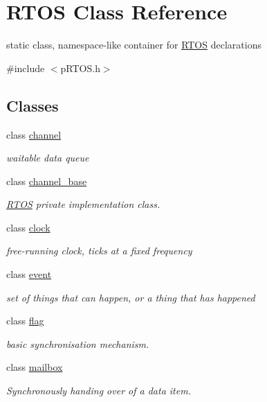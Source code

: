 \hypertarget{class_r_t_o_s}{}\section{R\+T\+OS Class Reference}
\label{class_r_t_o_s}


static class, namespace-\/like container for \hyperlink{class_r_t_o_s}{R\+T\+OS} declarations  




{\ttfamily \#include $<$p\+R\+T\+O\+S.\+h$>$}

\subsection*{Classes}
\begin{DoxyCompactItemize}
\item 
class \hyperlink{class_r_t_o_s_1_1channel}{channel}
\begin{DoxyCompactList}\small\item\em waitable data queue \end{DoxyCompactList}\item 
class \hyperlink{class_r_t_o_s_1_1channel__base}{channel\+\_\+base}
\begin{DoxyCompactList}\small\item\em \hyperlink{class_r_t_o_s}{R\+T\+OS} private implementation class. \end{DoxyCompactList}\item 
class \hyperlink{class_r_t_o_s_1_1clock}{clock}
\begin{DoxyCompactList}\small\item\em free-\/running clock, ticks at a fixed frequency \end{DoxyCompactList}\item 
class \hyperlink{class_r_t_o_s_1_1event}{event}
\begin{DoxyCompactList}\small\item\em set of things that can happen, or a thing that has happened \end{DoxyCompactList}\item 
class \hyperlink{class_r_t_o_s_1_1flag}{flag}
\begin{DoxyCompactList}\small\item\em basic synchronisation mechanism. \end{DoxyCompactList}\item 
class \hyperlink{class_r_t_o_s_1_1mailbox}{mailbox}
\begin{DoxyCompactList}\small\item\em Synchronously handing over of a data item. \end{DoxyCompactList}\item 

\end{DoxyCompactItemize}

